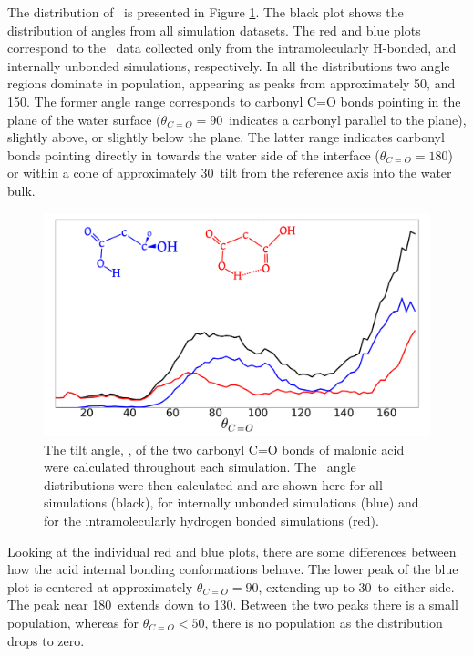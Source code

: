 The distribution of \thetacarb~is presented in Figure \ref{fig:theta-carb}. The black plot shows the distribution of angles from all simulation datasets. The red and blue plots correspond to the \thetacarb~data collected only from the intramolecularly H-bonded, and internally unbonded simulations, respectively. In all the distributions two angle regions dominate in population, appearing as peaks from approximately 50\degr, and 150\degr. The former angle range corresponds to carbonyl C=O bonds pointing in the plane of the water surface ($\theta_{C=O}=90$\degr~indicates a carbonyl parallel to the plane), slightly above, or slightly below the plane. The latter range indicates carbonyl bonds pointing directly in towards the water side of the interface ($\theta_{C=O}=180$\degr) or within a cone of approximately 30\degr~tilt from the reference axis into the water bulk.

\begin{figure}[h!]
	\begin{center}
		\includegraphics[scale=1.0]{images/orientation/ThetaCarbonyl.png}
		\caption{The tilt angle, \thetacarb, of the two carbonyl C=O bonds of malonic acid were calculated throughout each simulation. The \thetacarb~angle distributions were then calculated and are shown here for all simulations (black), for internally unbonded simulations (blue) and for the intramolecularly hydrogen bonded simulations (red).}
		\label{fig:theta-carb}
	\end{center}
\end{figure}

Looking at the individual red and blue plots, there are some differences between how the acid internal bonding conformations behave. The lower peak of the blue plot is centered at approximately $\theta_{C=O}=90$\degr, extending up to 30\degr~to either side. The peak near 180\degr~extends down to 130\degr. Between the two peaks there is a small population, whereas for $\theta_{C=O} < 50$\degr, there is no population as the distribution drops to zero. 

